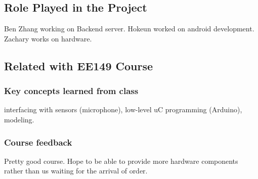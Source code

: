 \appendix

\subsection{Role Played in the Project}
\label{sec:role-played-project}
Ben Zhang working on Backend server.
Hokeun worked on android development.
Zachary works on hardware.

\subsection{Related with EE149 Course}
\label{sec:related-with-ee149}
\subsubsection{Key concepts learned from class}
\label{sec:key-concepts-learned}
interfacing with sensors (microphone), low-level uC programming (Arduino), modeling.

\subsubsection{Course feedback}
\label{sec:course-feedback}
Pretty good course. Hope to be able to provide more hardware components rather than us waiting for the arrival of order.

